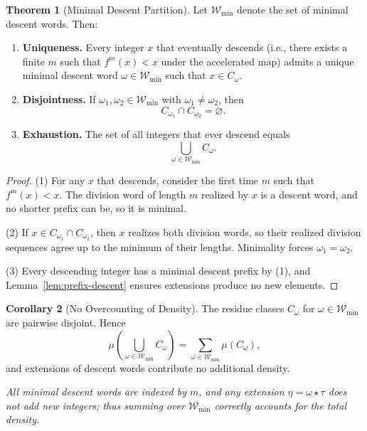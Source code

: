 \documentclass[12pt, oneside]{article}   	%
\numberwithin{equation}{section}          %
\theoremstyle{definition}
\newtheorem{theorem}{Theorem}
\newtheorem{corollary}[theorem]{Corollary}
\begin{document}
\begin{theorem}[Minimal Descent Partition]
\label{thm:minimal-partition}
Let $\mathcal{W}_{\min}$ denote the set of minimal descent words. Then:

\begin{enumerate}
\item \textbf{Uniqueness.}  
Every integer $x$ that eventually descends (i.e., there exists a finite $m$ such
that $f^m(x)<x$ under the accelerated map) admits a unique minimal descent word
$\omega \in \mathcal{W}_{\min}$ such that $x \in C_\omega$.

\item \textbf{Disjointness.}  
If $\omega_1, \omega_2 \in \mathcal{W}_{\min}$ with $\omega_1 \neq \omega_2$, then
\[
C_{\omega_1} \cap C_{\omega_2} = \varnothing.
\]

\item \textbf{Exhaustion.}  
The set of all integers that ever descend equals
\[
\bigcup_{\omega \in \mathcal{W}_{\min}} C_\omega.
\]
\end{enumerate}
\end{theorem}

\begin{proof}
(1) For any $x$ that descends, consider the first time $m$ such that $f^m(x)<x$.
The division word of length $m$ realized by $x$ is a descent word, and no
shorter prefix can be, so it is minimal.

(2) If $x \in C_{\omega_1} \cap C_{\omega_2}$, then $x$ realizes both division
words, so their realized division sequences agree up to the minimum of their lengths.
Minimality forces $\omega_1 = \omega_2$.

(3) Every descending integer has a minimal descent prefix by (1), and
Lemma~\ref{lem:prefix-descent} ensures extensions produce no new elements.
\end{proof}

\begin{corollary}[No Overcounting of Density]
\label{cor:no-overcount}
The residue classes $C_\omega$ for $\omega \in \mathcal{W}_{\min}$ are pairwise
disjoint. Hence
\[
\mu\!\left(\bigcup_{\omega\in\mathcal{W}_{\min}} C_\omega\right)
= \sum_{\omega\in\mathcal{W}_{\min}} \mu(C_\omega),
\]
and extensions of descent words contribute no additional density.

\emph{All minimal descent words are indexed by $m$, and any extension
$\eta = \omega \star \tau$ does not add new integers; thus summing over
$\mathcal{W}_{\min}$ correctly accounts for the total density.}
\end{corollary}
\end{document}
